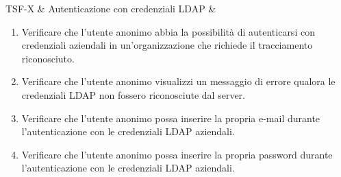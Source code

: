 TSF-X & Autenticazione con credenziali LDAP & \begin{enumerate}
\item Verificare che l'utente anonimo abbia la possibilità di autenticarsi con credenziali aziendali in un'organizzazione che richiede il tracciamento riconosciuto.
\item Verificare che l'utente anonimo visualizzi un messaggio di errore qualora le credenziali LDAP non fossero riconosciute dal server.
\item Verificare che l'utente anonimo possa inserire la propria e-mail durante l'autenticazione con le credenziali LDAP aziendali.
\item Verificare che l'utente anonimo possa inserire la propria password durante l'autenticazione con le credenziali LDAP aziendali.
\end{enumerate} \\
